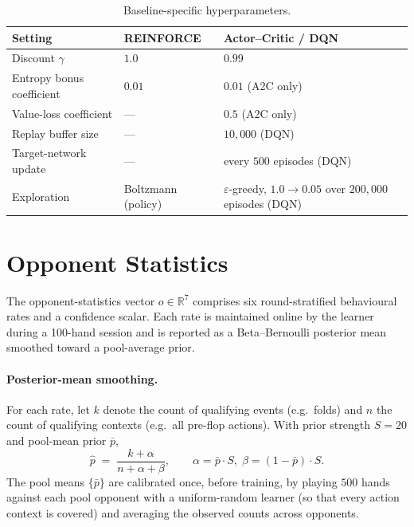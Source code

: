 \begin{table}[h]
\centering
\caption{Baseline-specific hyperparameters.}
\label{tab:baseline-hyper}
\begin{tabular}{lll}
\toprule
\textbf{Setting} & \textbf{REINFORCE} & \textbf{Actor--Critic / DQN} \\
\midrule
Discount $\gamma$           & $1.0$                   & $0.99$ \\
Entropy bonus coefficient   & $0.01$                  & $0.01$ (A2C only) \\
Value-loss coefficient      & ---                     & $0.5$ (A2C only) \\
Replay buffer size          & ---                     & $10{,}000$ (DQN) \\
Target-network update       & ---                     & every $500$ episodes (DQN) \\
Exploration                 & Boltzmann (policy)      & $\varepsilon$-greedy, $1.0 \to 0.05$ over $200{,}000$ episodes (DQN) \\
\bottomrule
\end{tabular}
\end{table}

\section{Opponent Statistics}
\label{app:oppstats}

The opponent-statistics vector $o \in \mathbb{R}^{7}$ comprises six
round-stratified behavioural rates and a confidence scalar. Each rate is
maintained online by the learner during a 100-hand session and is reported
as a Beta--Bernoulli posterior mean smoothed toward a pool-average prior.

\paragraph{Posterior-mean smoothing.}
For each rate, let $k$ denote the count of qualifying events
(e.g.\ folds) and $n$ the count of qualifying contexts
(e.g.\ all pre-flop actions). With prior strength $S=20$ and pool-mean
prior $\bar p$,
\begin{equation*}
\hat p \;=\; \frac{k + \alpha}{n + \alpha + \beta},
\qquad
\alpha = \bar p \cdot S,\;
\beta  = (1 - \bar p) \cdot S.
\end{equation*}
The pool means $\{\bar p\}$ are calibrated once, before training, by
playing $500$ hands against each pool opponent with a uniform-random
learner (so that every action context is covered) and averaging the
observed counts across opponents.

